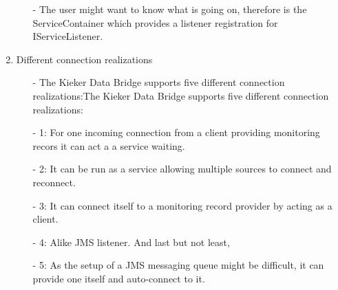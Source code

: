 \documentclass[11pt,a4paper]{article}
\begin{document}
\begin{enumerate}
\begin{itemize}
\item[-] The user might want to know what is going on, therefore is the ServiceContainer which provides a listener registration for IServiceListener.\newline
\end{itemize}

\item Different connection realizations\newline

\begin{itemize}
\item[-] The Kieker Data Bridge supports five different connection realizations:The Kieker Data Bridge supports five different connection realizations:\newline
\item[-] 1: For one incoming connection from a client providing monitoring recors it can act a a service waiting.\newline
\item[-] 2: It can be run as a service allowing multiple sources to connect and reconnect.\newline
\item[-] 3: It can connect itself to a monitoring record provider by acting as a client.\newline
\item[-] 4: Alike JMS listener. And last but not least,\newline
\item[-] 5: As the setup of a JMS messaging queue might be difficult, it can provide one itself and auto-connect to it.\newline
\end{itemize}

\end{enumerate}
\end{document}
